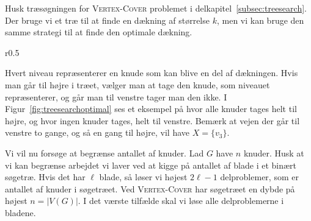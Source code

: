 Husk træsøgningen for \textsc{Vertex-Cover} problemet i delkapitel~\ref{subsec:treesearch}. Der bruge vi et træ til at finde en dækning af størrelse $k$, men vi kan bruge den samme strategi til at finde den optimale dækning.

\begin{wrapfigure}{r}{0.5\textwidth}
	\centering
	\caption{\label{fig:treesearchoptimal} Træsøgning til optimal dækning.}
\end{wrapfigure}

Hvert niveau repræsenterer en knude som kan blive en del af dækningen. Hvis man går til højre i træet, vælger man at tage den knude, som niveauet repræsenterer, og går man til venstre tager man den ikke. I Figur~\ref{fig:treesearchoptimal} ses et eksempel på hvor alle knuder tages helt til højre, og hvor ingen knuder tages, helt til venstre. Bemærk at vejen der går til venstre to gange, og så en gang til højre, vil have $X = \{v_{3}\}$.

Vi vil nu forsøge at begrænse antallet af knuder. Lad $G$ have $n$ knuder. Husk at vi kan begrænse arbejdet vi laver ved at kigge på antallet af blade i et binært søgetræ. Hvis det har $\ell$ blade, så løser vi højest $2\ell-1$ delproblemer, som er antallet af knuder i søgetræet. Ved \textsc{Vertex-Cover} har søgetræet en dybde på højest $n = |V(G)|$. I det værste tilfælde skal vi løse alle delproblemerne i bladene.

